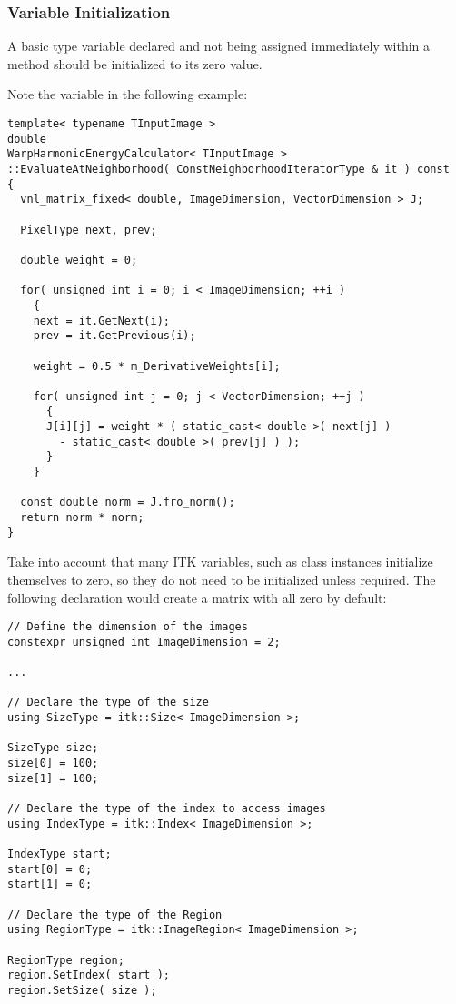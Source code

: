 \subsubsection{Variable Initialization}
\label{subsubsec:VariableInitialization}

A basic type variable declared and not being assigned immediately within a
method should be initialized to its zero value.

Note the  variable in the following example:

\small
\begin{verbatim}
template< typename TInputImage >
double
WarpHarmonicEnergyCalculator< TInputImage >
::EvaluateAtNeighborhood( ConstNeighborhoodIteratorType & it ) const
{
  vnl_matrix_fixed< double, ImageDimension, VectorDimension > J;

  PixelType next, prev;

  double weight = 0;

  for( unsigned int i = 0; i < ImageDimension; ++i )
    {
    next = it.GetNext(i);
    prev = it.GetPrevious(i);

    weight = 0.5 * m_DerivativeWeights[i];

    for( unsigned int j = 0; j < VectorDimension; ++j )
      {
      J[i][j] = weight * ( static_cast< double >( next[j] )
        - static_cast< double >( prev[j] ) );
      }
    }

  const double norm = J.fro_norm();
  return norm * norm;
}
\end{verbatim}
\normalsize

Take into account that many ITK variables, such as  class
instances initialize themselves to zero, so they do not need to be initialized
unless required. The following declaration would create a matrix with all zero
by default:

\small
\begin{verbatim}
// Define the dimension of the images
constexpr unsigned int ImageDimension = 2;

...

// Declare the type of the size
using SizeType = itk::Size< ImageDimension >;

SizeType size;
size[0] = 100;
size[1] = 100;

// Declare the type of the index to access images
using IndexType = itk::Index< ImageDimension >;

IndexType start;
start[0] = 0;
start[1] = 0;

// Declare the type of the Region
using RegionType = itk::ImageRegion< ImageDimension >;

RegionType region;
region.SetIndex( start );
region.SetSize( size );
\end{verbatim}
\normalsize


